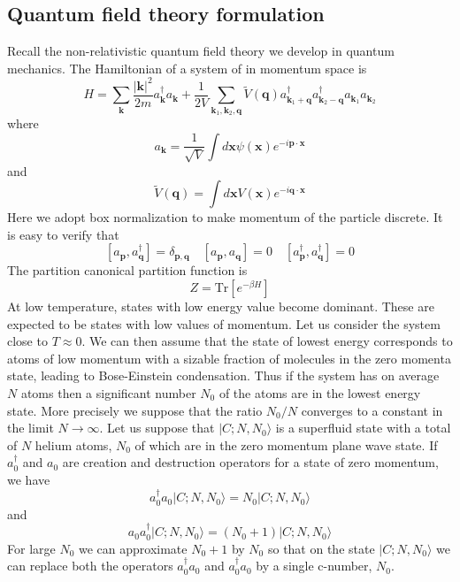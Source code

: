 \documentclass[cyan]{elegantnote}
\begin{document}
\subsection{Quantum field theory formulation}
Recall the non-relativistic quantum field theory we develop in quantum mechanics.
The Hamiltonian of a system of  in momentum space is
\[H = \sum_{\bm{k}} \frac{|\bm{k}|^2}{2m} a_{\bm{k}}^{\dagger} a_{\bm{k}} + \frac{1}{2V} \sum_{\bm{k}_1,\bm{k}_2,\bm{q}} \tilde{V}(\bm{q}) a^{\dagger}_{\bm{k}_1 + \bm{q}} a^{\dagger}_{\bm{k}_2-\bm{q}} a_{\bm{k}_1} a_{\bm{k}_2}\]
where
\[a_{\bm{k}} = \frac{1}{\sqrt{V}} \int d\bm{x}\psi(\bm{x}) e^{-i\bm{p}\cdot\bm{x}}\]
and
\[\tilde{V}(\bm{q}) = \int d\bm{x} V(\bm{x}) e^{-i\bm{q}\cdot\bm{x}}\]
Here we adopt box normalization to make momentum of the particle discrete. It is easy to verify that
\[[a_{\bm{p}},a_{\bm{q}}^{\dagger}] = \delta_{\bm{p},\bm{q}} \quad [a_{\bm{p}},a_{\bm{q}}] = 0 \quad [a^{\dagger}_{\bm{p}},a^{\dagger}_{\bm{q}}] = 0\]
The partition canonical partition function is
\[Z = \mathrm{Tr}[e^{-\beta H}]\]
At low temperature, states with low energy value become dominant. These are expected to be states with low values of momentum. 
Let us consider the system close to $T \approx 0$. 
We can then assume that the state of lowest energy corresponds to atoms of low momentum with a sizable fraction of molecules in the zero momenta state, leading to Bose-Einstein condensation. 
Thus if the system has on average $N$ atoms then a significant number $N_0$ of the atoms are in the lowest energy state. More precisely we suppose that the ratio $N_0 / N$ converges to a constant in the limit $N \to \infty$. 
Let us suppose that $|C;N,N_0\rangle$ is a superfluid state with a total of $N$ helium atoms, $N_0$ of which are in the zero momentum plane wave state. 
If $a_0^{\dagger}$ and $a_0$ are creation and destruction operators for a state of zero momentum, we have
\[a_0^{\dagger}a_0 |C;N,N_0\rangle = N_0 |C;N,N_0\rangle\]
and
\[a_0a_0^{\dagger} |C;N,N_0\rangle = (N_0+1) |C;N,N_0\rangle\]
For large $N_0$ we can approximate $N_0 + 1$ by $N_0$ so that on the state $|C;N,N_0\rangle$ we can replace both the operators $a_0^{\dagger}a_0$ and $a_0^{\dagger}a_0$ by a single c-number, $N_0$.
\end{document}
